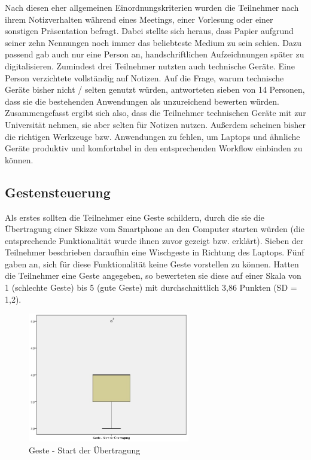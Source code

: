 \documentclass{chi-ext}
\begin{document}
Nach diesen eher allgemeinen Einordnungskriterien wurden die Teilnehmer nach ihrem Notizverhalten während eines Meetings, einer Vorlesung oder einer sonstigen Präsentation befragt.
Dabei stellte sich heraus, dass Papier aufgrund seiner zehn Nennungen noch immer das beliebteste Medium zu sein schien. Dazu passend gab auch nur eine Person an, handschriftlichen Aufzeichnungen später zu digitalisieren. Zumindest drei Teilnehmer nutzten auch technische Geräte. Eine Person verzichtete vollständig auf Notizen.
Auf die Frage, warum technische Geräte bisher nicht / selten genutzt würden, antworteten sieben von 14 Personen, dass sie die bestehenden Anwendungen als unzureichend bewerten würden.
Zusammengefasst ergibt sich also, dass die Teilnehmer technischen Geräte mit zur Universität nehmen, sie aber selten für Notizen nutzen. Außerdem scheinen bisher die richtigen Werkzeuge bzw. Anwendungen zu fehlen, um Laptops und ähnliche Geräte produktiv und komfortabel in den entsprechenden Workflow einbinden zu können.

\subsection{Gestensteuerung}

Als erstes sollten die Teilnehmer eine Geste schildern, durch die sie die Übertragung einer Skizze vom Smartphone an den Computer starten würden (die entsprechende Funktionalität wurde ihnen zuvor gezeigt bzw. erklärt). Sieben der Teilnehmer beschrieben daraufhin eine Wischgeste in Richtung des Laptops. Fünf gaben an, sich für diese Funktionalität keine Geste vorstellen zu können. Hatten die Teilnehmer eine Geste angegeben, so bewerteten sie diese auf einer Skala von 1 (schlechte Geste) bis 5 (gute Geste) mit durchschnittlich 3,86 Punkten (SD = 1,2).

\begin{figure}
  \centering
  \includegraphics[width=200pt]{img/studie/Geste_Start_Uebertragung.jpg}
  \caption{Geste - Start der Übertragung}
  \label{fig:studie_Geste_Start_Uebertragung}
\end{figure}
\end{document}
